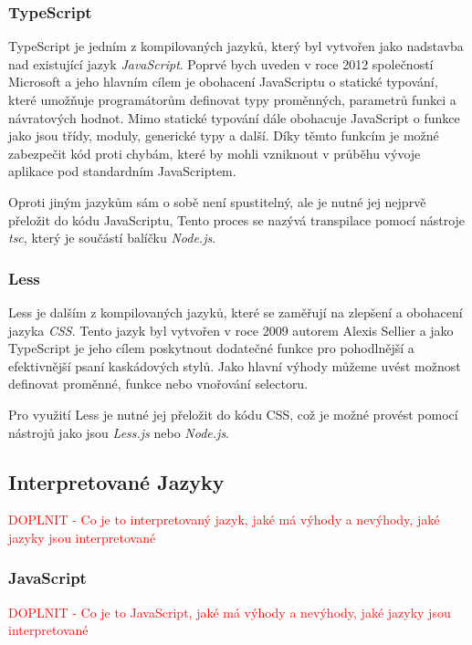 \subsubsection{TypeScript}
\label{subsubsec:languages-compiled-typescript}
TypeScript je jedním z kompilovaných jazyků, který byl vytvořen jako nadstavba nad existující jazyk \textit{JavaScript}. Poprvé bych uveden v roce 2012 společností Microsoft a jeho hlavním cílem je obohacení JavaScriptu o statické typování, které umožňuje programátorům definovat typy proměnných, parametrů funkci a návratových hodnot. Mimo statické typování dále obohacuje JavaScript o funkce jako jsou třídy, moduly, generické typy a další. Díky těmto funkcím je možné zabezpečit kód proti chybám, které by mohli vzniknout v průběhu vývoje aplikace pod standardním JavaScriptem.

Oproti jiným jazykům sám o sobě není spustitelný, ale je nutné jej nejprvě přeložit do kódu JavaScriptu, Tento proces se nazývá transpilace pomocí nástroje \textit{tsc}, který je součástí balíčku \textit{Node.js}.

\subsubsection{Less}
\label{subsubsec:languages-compiled-less}
Less je dalším z kompilovaných jazyků, které se zaměřují na zlepšení a obohacení jazyka \textit{CSS}. Tento jazyk byl vytvořen v roce 2009 autorem Alexis Sellier a jako TypeScript je jeho cílem poskytnout dodatečné funkce pro pohodlnější a efektivnější psaní kaskádových stylů. Jako hlavní výhody můžeme uvést možnost definovat proměnné, funkce nebo vnořování selectoru.

Pro využití Less je nutné jej přeložit do kódu CSS, což je možné provést pomocí nástrojů jako jsou \textit{Less.js} nebo \textit{Node.js}.

\subsection{Interpretované Jazyky}
\label{subsec:languages-interpreted}
\textcolor{red}{DOPLNIT - Co je to interpretovaný jazyk, jaké má výhody a nevýhody, jaké jazyky jsou interpretované}

\subsubsection{JavaScript}
\label{subsubsec:languages-interpreted-javascript}
\textcolor{red}{DOPLNIT - Co je to JavaScript, jaké má výhody a nevýhody, jaké jazyky jsou interpretované}

